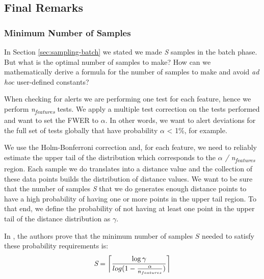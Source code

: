 \subsection{Final Remarks}

\subsubsection*{Minimum Number of Samples} \label{sec:nsamples}
In Section \ref{sec:sampling-batch} we stated we made \textit{S} samples in the batch phase. But what is the optimal number of samples to make? How can we mathematically derive a formula for the number of samples to make and avoid \textit{ad hoc} user-defined constants?

When checking for alerts we are performing one test for each feature, hence we perform \textit{n\textsubscript{features}} tests. We apply a multiple test correction on the tests performed and want to set the FWER to $\alpha$. In other words, we want to alert deviations for the full set of tests globally that have probability $\alpha$ < 1\%, for example.

We use the Holm-Bonferroni correction and, for each feature, we need to reliably estimate the upper tail of the distribution which corresponds to the \textit{$\alpha$ / n\textsubscript{features}} region. Each sample we do translates into a distance value and the collection of these data points builds the distribution of distance values. We want to be sure that the number of samples \textit{S} that we do generates enough distance points to have a high probability of having one or more points in the upper tail region. To that end, we define the probability of not having at least one point in the upper tail of the distance distribution as $\gamma$. 

In \cite{SAMM}, the authors prove that the minimum number of samples $S$ needed to satisfy these probability requirements is:
\begin{equation}
    \label{eq:optimal-n-samples}
    \textit{S} = \ceil[\bigg]{\frac{\log\gamma}{log(1 - \frac{\alpha}{n_{features}})}}
\end{equation}

